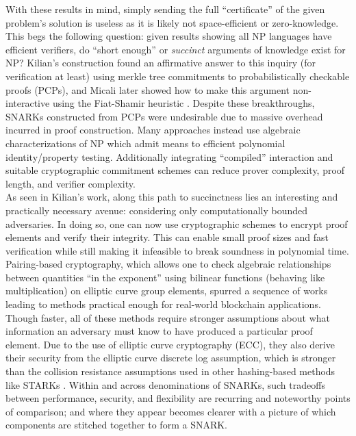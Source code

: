 \noindent With these results in mind, simply sending the full ``certificate'' of the given problem's solution is useless as it is likely not space-efficient or zero-knowledge. This begs the following question: given results showing all NP languages have efficient verifiers, do ``short enough'' or \textit{succinct} arguments of knowledge exist for NP? Kilian's construction \cite{kilian} found an affirmative answer to this inquiry (for verification at least) using merkle tree commitments to probabilistically checkable proofs (PCPs), and Micali later showed how to make this argument non-interactive \cite{micalisnark} using the Fiat-Shamir heuristic \cite{fiatshamir}. Despite these breakthroughs, SNARKs constructed from PCPs were undesirable due to massive overhead incurred in proof construction. Many approaches instead use algebraic characterizations of NP which admit means to efficient polynomial identity/property testing. Additionally integrating ``compiled'' interaction and suitable cryptographic commitment schemes can reduce prover complexity, proof length, and verifier complexity.\\

\noindent As seen in Kilian's work, along this path to succinctness lies an interesting and practically necessary avenue: considering only computationally bounded adversaries. In doing so, one can now use cryptographic schemes to encrypt proof elements and verify their integrity. This can enable small proof sizes and fast verification while still making it infeasible to break soundness in polynomial time. Pairing-based cryptography, which allows one to check algebraic relationships between quantities ``in the exponent'' using bilinear functions (behaving like multiplication) on elliptic curve group elements, spurred a sequence of works leading to methods practical enough for real-world blockchain applications. Though faster, all of these methods require stronger assumptions about what information an adversary must know to have produced a particular proof element. Due to the use of elliptic curve cryptography (ECC), they also derive their security from the elliptic curve discrete log assumption, which is stronger than the collision resistance assumptions used in other hashing-based methods like STARKs \cite{starks}. Within and across denominations of SNARKs, such tradeoffs between performance, security, and flexibility are recurring and noteworthy points of comparison; and where they appear becomes clearer with a picture of which components are stitched together to form a SNARK.


